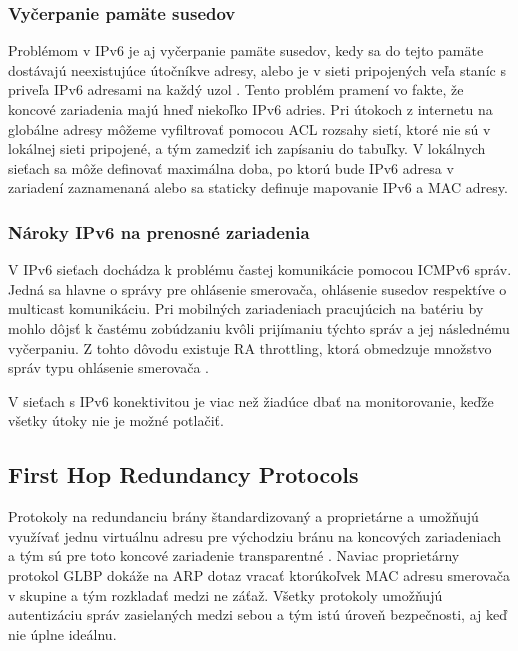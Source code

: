\subsubsection*{Vyčerpanie pamäte susedov}
Problémom v IPv6 je aj vyčerpanie pamäte susedov, kedy sa do tejto pamäte dostávajú neexistujúce útočníkve adresy, alebo je v sieti pripojených veľa staníc s priveľa IPv6 adresami na každý uzol \cite{Podermanski1232015} \cite{Podermanski1932015}. Tento problém pramení vo fakte, že koncové zariadenia majú hneď niekoľko IPv6 adries. Pri útokoch z internetu na globálne adresy môžeme vyfiltrovať pomocou ACL rozsahy sietí, ktoré nie sú v lokálnej sieti pripojené, a tým zamedziť ich zapísaniu do tabuľky. V lokálnych sieťach sa môže definovať maximálna doba, po ktorú bude IPv6 adresa v zariadení zaznamenaná alebo sa staticky definuje mapovanie IPv6 a MAC adresy. 

\subsubsection*{Nároky IPv6 na prenosné zariadenia}
V IPv6 sieťach dochádza k problému častej komunikácie pomocou ICMPv6 správ. Jedná sa hlavne o správy pre ohlásenie smerovača, ohlásenie susedov respektíve o multicast komunikáciu. Pri mobilných zariadeniach pracujúcich na batériu by mohlo dôjsť k častému zobúdzaniu kvôli prijímaniu týchto správ a jej následnému vyčerpaniu. Z tohto dôvodu existuje RA throttling, ktorá obmedzuje množstvo správ typu ohlásenie smerovača \cite{Podermanski532015}.


V sieťach s IPv6 konektivitou je viac než žiadúce dbať na monitorovanie, keďže všetky útoky nie je možné potlačiť. 



\subsection*{First Hop Redundancy Protocols}
Protokoly na redundanciu brány štandardizovaný  a proprietárne  a  umožňujú využívať jednu virtuálnu adresu pre východziu bránu na koncových zariadeniach a tým sú pre toto koncové zariadenie transparentné \cite{Lammle2013}. Naviac proprietárny protokol GLBP dokáže na ARP dotaz vracať ktorúkoľvek MAC adresu smerovača v skupine a tým rozkladať medzi ne záťaž. Všetky protokoly umožňujú autentizáciu správ zasielaných medzi sebou a tým istú úroveň bezpečnosti, aj keď nie úplne ideálnu.  

